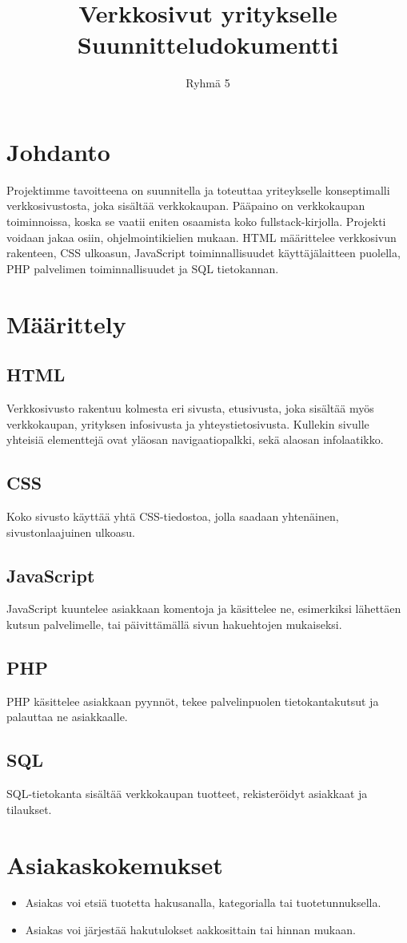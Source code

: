 \documentclass{article}
\author{Ryhmä 5}
\title{Verkkosivut yritykselle\\
\large Suunnitteludokumentti}
\begin{document}
\maketitle
\section{Johdanto}
Projektimme tavoitteena on suunnitella ja toteuttaa yriteykselle konseptimalli verkkosivustosta, joka sisältää verkkokaupan. Pääpaino on verkkokaupan
toiminnoissa, koska se vaatii eniten osaamista koko fullstack-kirjolla. Projekti voidaan jakaa osiin, ohjelmointikielien mukaan. HTML määrittelee verkkosivun rakenteen,
CSS ulkoasun, JavaScript toiminnallisuudet käyttäjälaitteen puolella, PHP palvelimen toiminnallisuudet ja SQL tietokannan.

\section{Määrittely}
\subsection{HTML}
Verkkosivusto rakentuu kolmesta eri sivusta, etusivusta, joka sisältää myös verkkokaupan, yrityksen infosivusta ja yhteystietosivusta. Kullekin sivulle yhteisiä elementtejä ovat yläosan navigaatiopalkki, sekä alaosan infolaatikko.

\subsection{CSS}
Koko sivusto käyttää yhtä CSS-tiedostoa, jolla saadaan yhtenäinen, sivustonlaajuinen ulkoasu.

\subsection{JavaScript}
JavaScript kuuntelee asiakkaan komentoja ja käsittelee ne, esimerkiksi lähettäen kutsun palvelimelle, tai päivittämällä sivun hakuehtojen mukaiseksi.
\subsection{PHP}
PHP käsittelee asiakkaan pyynnöt, tekee palvelinpuolen tietokantakutsut ja palauttaa ne asiakkaalle.
\subsection{SQL}
SQL-tietokanta sisältää verkkokaupan tuotteet, rekisteröidyt asiakkaat ja tilaukset.

\section{Asiakaskokemukset}

\begin{itemize}
    \item Asiakas voi etsiä tuotetta hakusanalla, kategorialla tai tuotetunnuksella.
    \item Asiakas voi järjestää hakutulokset aakkosittain tai hinnan mukaan.
\end{itemize}
\end{document}
